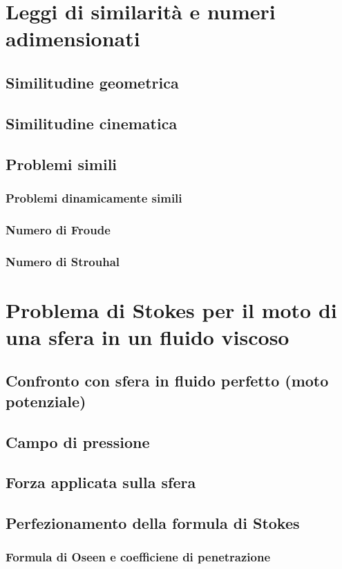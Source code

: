 \documentclass[a4paper,11pt]{report}
\begin{document}
\chapter{Leggi di similarità e numeri adimensionati}

	\section{Similitudine geometrica}
	\section{Similitudine cinematica}
	\section{Problemi simili}
		\subsection{Problemi dinamicamente simili}
		\subsection{Numero di Froude}
		\subsection{Numero di Strouhal}
	
\chapter{Problema di Stokes per il moto di una sfera in un fluido viscoso}

	\section{Confronto con sfera in fluido perfetto (moto potenziale)}
	\section{Campo di pressione}
	\section{Forza applicata sulla sfera}
	\section{Perfezionamento della formula di Stokes}
		\subsection{Formula di Oseen e coefficiene di penetrazione}
		
\end{document}
